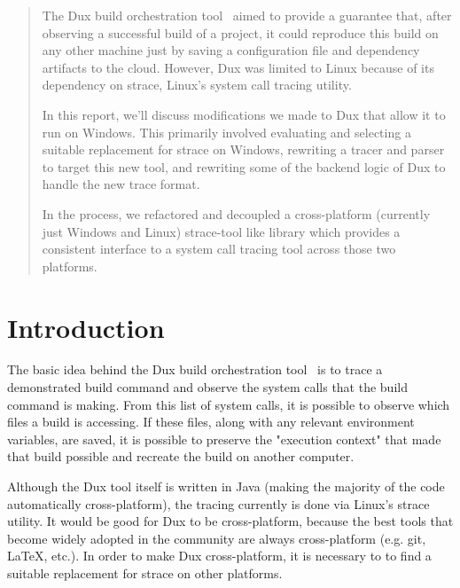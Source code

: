 \documentclass[10pt,conference]{IEEEtran}
\begin{document}
\maketitle

\lstset{language=bash}

\begin{abstract}

The Dux build orchestration tool~\cite{dux} aimed to provide a guarantee that,
after observing a successful build of a project, it could reproduce this build on
any other machine just by saving a configuration file and dependency artifacts
to the cloud. However, Dux was limited to Linux because of its dependency on strace,
Linux's system call tracing utility.

In this report, we'll discuss modifications we made to Dux that allow it to run on
Windows. This primarily involved evaluating and selecting a suitable replacement 
for strace on Windows, rewriting a tracer and parser to target this new tool, and
rewriting some of the backend logic of Dux to handle the new trace format.

In the process, we refactored and decoupled a cross-platform (currently just Windows
and Linux) strace-tool like library which provides a consistent interface to a system
call tracing tool across those two platforms.

\end{abstract}

\section{Introduction}

The basic idea behind the Dux build orchestration tool~\cite{dux} is to trace
a demonstrated build command and observe the system calls that the build command is
making. From this list of system calls, it is possible to observe which files a
build is accessing. If these files, along with any relevant environment variables, 
are saved, it is possible to preserve the "execution context" that made that build
possible and recreate the build on another computer. 

Although the Dux tool itself is written in Java (making the majority of the code
automatically cross-platform), the tracing currently is done via Linux's strace utility. 
It would be good for Dux to be cross-platform, because the best tools that become
widely adopted in the community are always cross-platform (e.g. git, LaTeX, etc.).
In order to make Dux cross-platform, it is necessary to to find a suitable replacement
for strace on other platforms. 
\end{document}

